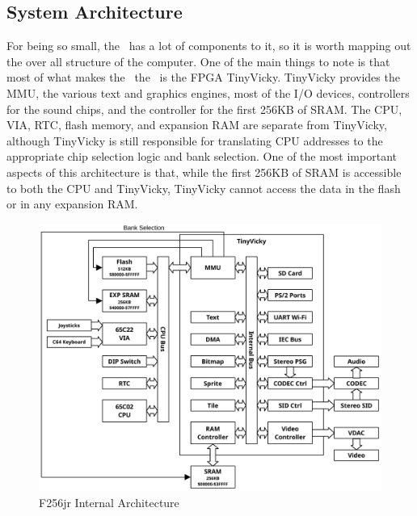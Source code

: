 \subsection*{System Architecture}

For being so small, the \jr\ has a lot of components to it, so it is worth mapping out the over all structure of the computer. One of the main things to note is that most of what makes the \jr\ the \jr\ is the FPGA TinyVicky. TinyVicky provides the MMU, the various text and graphics engines, most of the I/O devices, controllers for the sound chips, and the controller for the first 256KB of SRAM. The CPU, VIA, RTC, flash memory, and expansion RAM are separate from TinyVicky, although TinyVicky is still responsible for translating CPU addresses to the appropriate chip selection logic and bank selection. One of the most important aspects of this architecture is that, while the first 256KB of SRAM is accessible to both the CPU and TinyVicky, TinyVicky cannot access the data in the flash or in any expansion RAM.

\begin{figure}[ht]
    \begin{center}
        \includegraphics[scale=0.55]{images/f256jr_layout.pdf}
    \end{center}
    \caption{F256jr Internal Architecture}
    \label{fig:arch}
\end{figure}
